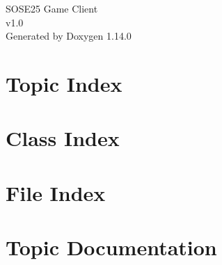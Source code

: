\documentclass[twoside]{book}
\newcommand{\+}{\discretionary{\mbox{\scriptsize$\hookleftarrow$}}{}{}}
\newcommand{\clearemptydoublepage}{%
    \newpage{\pagestyle{empty}\cleardoublepage}%
  }
\begin{document}
  \raggedbottom
    \hypersetup{pageanchor=false,
                bookmarksnumbered=true,
                pdfencoding=unicode
               }
  \begin{titlepage}
  \vspace*{7cm}
  \begin{center}%
  {\Large SOSE25 Game Client}\\
  [1ex]\large v1.\+0 \\
  \vspace*{1cm}
  {\large Generated by Doxygen 1.14.0}\\
  \end{center}
  \end{titlepage}
  \clearemptydoublepage
  \tableofcontents
  \clearemptydoublepage
  \hypersetup{pageanchor=true}












\chapter{Topic Index}

\chapter{Class Index}

\chapter{File Index}

\chapter{Topic Documentation}

\end{document}

